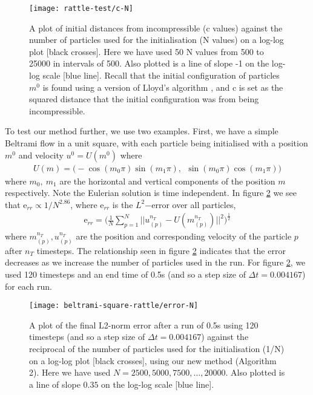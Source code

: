\documentclass[11pt, oneside]{article}   	%
\newcommand{\dt}{\Delta t}
\begin{document}
\begin{figure}[H]
\texttt{[image: rattle-test/c-N]}
\centering
\caption{A plot of initial distances from incompressible (c values) against the number of particles used for the initialisation (N values) on a log-log plot [black crosses]. Here we have used 50 N values from 500 to 25000 in intervals of 500. Also plotted is a line of slope -1 on the log-log scale [blue line]. Recall that the initial configuration of particles \(m^0\) is found using a version of Lloyd's algorithm \citep{merigot2017algorithm}, and c is set as the squared distance that the initial configuration was from being incompressible. }
\centering
\label{fig:c-N}
\end{figure}

To test our method further, we use two examples. First, we have a simple Beltrami flow in a unit square, with each particle being initialised with a position \(m^0\) and velocity \(u^0 = U(m^0)\) where
\begin{align}
U(m) = \big( -\cos(m_0 \pi) \sin(m_1 \pi), \: \: \sin(m_0 \pi) \cos(m_1 \pi) \big)
\end{align}
where \(m_0, \: m_1\) are the horizontal and vertical components of the position \(m\) respectively. Note the Eulerian solution is time independent. In figure \ref{fig:error-N} we see that \(\text{e}_{rr} \propto 1/N^{2.86}\), where \(\text{e}_{rr}\) is the \(L^2\mathrm{-error}\) over all particles,
\begin{align}
\text{e}_{rr} = \Big( \frac{1}{N} \sum_{p = 1}^{N} || u^{n_T}_{(p)} - U(m^{n_T}_{(p)}) ||^2 \Big) ^\frac{1}{2}
\end{align}
where \(m^{n_T}_{(p)}, u^{n_T}_{(p)}\) are the position and corresponding velocity of the particle \(p\) after \(n_T\) timesteps. The relationship seen in figure \ref{fig:error-N} indicates that the error decreases as we increase the number of particles used in the run. For figure \ref{fig:error-N}, we used 120 timesteps and an end time of 0.5s (and so a step size of \(\dt = 0.004167\)) for each run. 

\begin{figure}[H]
\texttt{[image: beltrami-square-rattle/error-N]}
\centering
\caption{A plot of the final L2-norm error after a run of 0.5s using 120 timesteps (and so a step size of \(\dt = 0.004167\)) against the reciprocal of the number of particles used for the initialisation (1/N) on a log-log plot [black crosses], using our new method (Algorithm 2). Here we have used \(N = 2500,5000,7500,\dots,20000\). Also plotted is a line of slope \(0.35\) on the log-log scale [blue line].}
\centering
\label{fig:error-N}
\end{figure}
\end{document}

